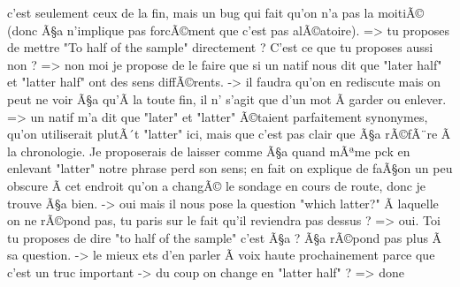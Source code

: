 \documentclass[12pt]{article} %
\begin{document}
c'est seulement ceux de la fin, mais un bug qui fait qu'on n'a pas la moitiÃ© (donc Ã§a n'implique pas forcÃ©ment que c'est pas alÃ©atoire). => tu proposes de mettre "To half of the sample" directement ? C'est ce que tu proposes aussi non ? => non moi je propose de le faire que si un natif nous dit que "later half" et "latter half" ont des sens diffÃ©rents. -> il faudra qu'on en rediscute mais on peut ne voir Ã§a qu'Ã  la toute fin, il n' s'agit que d'un mot Ã  garder ou enlever. => un natif m'a dit que "later" et "latter" Ã©taient parfaitement synonymes, qu'on utiliserait plutÃ´t "latter" ici, mais que c'est pas clair que Ã§a rÃ©fÃ¨re Ã  la chronologie. Je proposerais de laisser comme Ã§a quand mÃªme pck en enlevant "latter" notre phrase perd son sens; en fait on explique de faÃ§on un peu obscure Ã  cet endroit qu'on a changÃ© le sondage en cours de route, donc je trouve Ã§a bien. -> oui mais il nous pose la question "which latter?" Ã  laquelle on ne rÃ©pond pas, tu paris sur le fait qu'il reviendra pas dessus ? => oui. Toi tu proposes de dire "to half of the sample" c'est Ã§a ? Ã§a rÃ©pond pas plus Ã  sa question. -> le mieux ets d'en parler Ã  voix haute prochainement parce que c'est un truc important -> du coup on change en "latter half" ? => done
\end{document}
